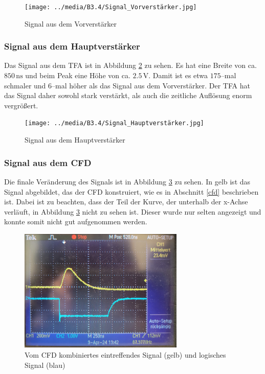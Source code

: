 \documentclass[12pt,a4paper]{scrartcl}
\numberwithin{equation}{section} %
\begin{document}
\begin{figure}[h]
	\centering
	\texttt{[image: ../media/B3.4/Signal\_Vorverstärker.jpg]}
	\caption{Signal aus dem Vorverstärker}
	\label{fig:signal_vv}
\end{figure}

\subsubsection{Signal aus dem Hauptverstärker}
Das Signal aus dem TFA ist in Abbildung \ref{fig:signal_vv+hv} zu sehen. Es hat eine Breite von ca. $850 \mathrm{\, ns}$ und beim Peak eine Höhe von ca. $2.5 \mathrm{\, V}$. Damit ist es etwa $175$--mal schmaler und $6$--mal höher als das Signal aus dem Vorverstärker. Der TFA hat das Signal daher sowohl stark verstärkt, als auch die zeitliche Auflösung enorm vergrößert.

\begin{figure}[h]
	\centering
	\texttt{[image: ../media/B3.4/Signal\_Hauptverstärker.jpg]}
	\caption{Signal aus dem Hauptverstärker}
	\label{fig:signal_vv+hv}
\end{figure}

\subsubsection{Signal aus dem CFD}
Die finale Veränderung des Signals ist in Abbildung \ref{fig:signal_cfd} zu sehen. In gelb ist das Signal abgebildet, das der CFD konstruiert, wie es in Abschnitt \ref{cfd} beschrieben ist. Dabei ist zu beachten, dass der Teil der Kurve, der unterhalb der x-Achse verläuft, in Abbildung \ref{fig:signal_cfd} nicht zu sehen ist. Dieser wurde nur selten angezeigt und konnte somit nicht gut aufgenommen werden.

\begin{figure}[h]
	\centering
	\includegraphics[width=0.7\textwidth]{../media/B3.4/Signal_CFD.jpg}
	\caption{Vom CFD kombiniertes eintreffendes Signal (gelb) und logisches Signal (blau)}
	\label{fig:signal_cfd}
\end{figure}
\end{document}
